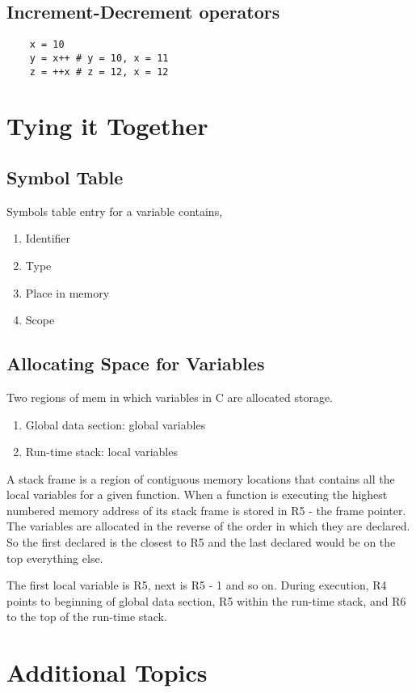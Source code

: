 \subsection{Increment-Decrement operators}
\begin{verbatim}
    x = 10 
    y = x++ # y = 10, x = 11
    z = ++x # z = 12, x = 12
\end{verbatim}



\section{Tying it Together}
\subsection{Symbol Table}
Symbols table entry for a variable contains, 
\begin{enumerate}
    \item Identifier
    \item Type
    \item Place in memory
    \item Scope
\end{enumerate}

\subsection{Allocating Space for Variables}
Two regions of mem in which variables in C are allocated storage.
\begin{enumerate}
    \item Global data section: global variables
    \item Run-time stack: local variables
\end{enumerate}

A stack frame is a region of contiguous memory locations that contains all the local variables for a given function. When a function is executing the highest numbered memory address of its stack frame is stored in R5 - the frame pointer. The variables are allocated in the reverse of the order in which they are declared. So the first declared is the closest to R5 and the last declared would be on the top everything else.

The first local variable is R5, next is R5 - 1 and so on. During execution, R4 points to beginning of global data section, R5 within the run-time stack, and R6 to the top of the run-time stack.


\section{Additional Topics}
